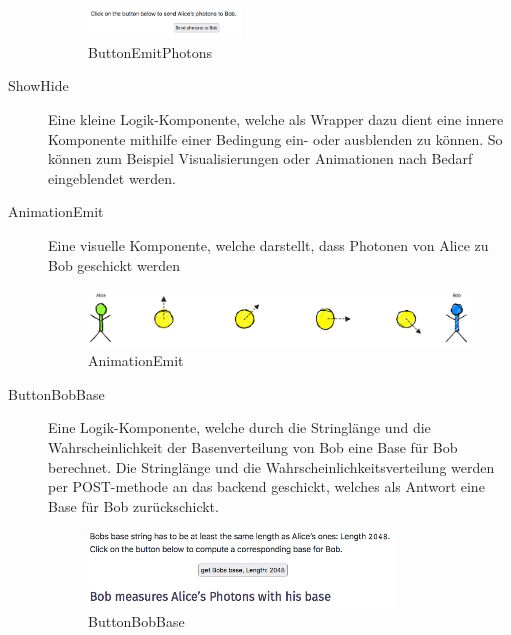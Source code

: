 \documentclass[a4paper,10.2pt,pdftex]{scrartcl}%
\begin{document}
\begin{description}
\begin{figure}[h]
	\centering
  \includegraphics[width=0.4\textwidth]{graphics/component_button_emit_photons.png}
	\caption{ButtonEmitPhotons}
\end{figure}
\item[ShowHide] Eine kleine Logik-Komponente, welche als Wrapper dazu dient eine innere Komponente mithilfe einer Bedingung ein- oder ausblenden zu können. So können zum Beispiel Visualisierungen oder Animationen nach Bedarf eingeblendet werden.
\item[AnimationEmit] Eine visuelle Komponente, welche darstellt, dass Photonen von Alice zu Bob geschickt werden
\begin{figure}[h]
	\centering
  \includegraphics[width=\textwidth]{graphics/component_animation_emit.png}
	\caption{AnimationEmit}
\end{figure}
\item[ButtonBobBase] Eine Logik-Komponente, welche durch die Stringlänge und die Wahrscheinlichkeit der Basenverteilung von Bob eine Base für Bob berechnet. Die Stringlänge und die Wahrscheinlichkeitsverteilung werden per POST-methode an das backend geschickt, welches als Antwort eine Base für Bob zurückschickt. 
\begin{figure}[h]
	\centering
  \includegraphics[width=0.8\textwidth]{graphics/component_button_bob_base.png}
	\caption{ButtonBobBase}
\end{figure}
\end{description}
\end{document}
